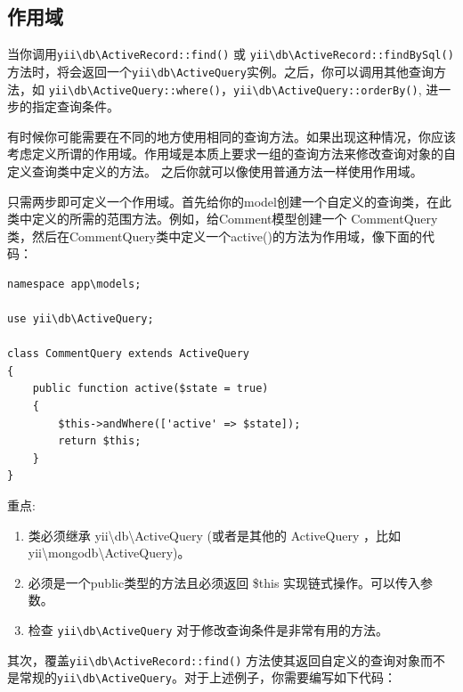 \subsection{作用域}
当你调用\texttt{yii{\allowbreak{}\textbackslash}db{\allowbreak{}\textbackslash}ActiveRecord\allowbreak{}::\allowbreak{}find()} 或 \texttt{yii{\allowbreak{}\textbackslash}db{\allowbreak{}\textbackslash}ActiveRecord\allowbreak{}::\allowbreak{}findBySql()}方法时，将会返回一个\texttt{yii{\allowbreak{}\textbackslash}db{\allowbreak{}\textbackslash}ActiveQuery}实例。之后，你可以调用其他查询方法，如 \texttt{yii{\allowbreak{}\textbackslash}db{\allowbreak{}\textbackslash}ActiveQuery\allowbreak{}::\allowbreak{}where()}，\texttt{yii{\allowbreak{}\textbackslash}db{\allowbreak{}\textbackslash}ActiveQuery\allowbreak{}::\allowbreak{}orderBy()}, 进一步的指定查询条件。

有时候你可能需要在不同的地方使用相同的查询方法。如果出现这种情况，你应该考虑定义所谓的作用域。作用域是本质上要求一组的查询方法来修改查询对象的自定义查询类中定义的方法。 之后你就可以像使用普通方法一样使用作用域。

只需两步即可定义一个作用域。首先给你的model创建一个自定义的查询类，在此类中定义的所需的范围方法。例如，给Comment模型创建一个 CommentQuery类，然后在CommentQuery类中定义一个active()的方法为作用域，像下面的代码：

\lstset{language=php}\begin{lstlisting}
namespace app\models;

use yii\db\ActiveQuery;

class CommentQuery extends ActiveQuery
{
    public function active($state = true)
    {
        $this->andWhere(['active' => $state]);
        return $this;
    }
}
\end{lstlisting}
重点:

\begin{enumerate}
\item 类必须继承 yii{\textbackslash}db{\textbackslash}ActiveQuery (或者是其他的 ActiveQuery ，比如 yii{\textbackslash}mongodb{\textbackslash}ActiveQuery)。
\item 必须是一个public类型的方法且必须返回 \$this 实现链式操作。可以传入参数。
\item 检查 \texttt{yii{\allowbreak{}\textbackslash}db{\allowbreak{}\textbackslash}ActiveQuery} 对于修改查询条件是非常有用的方法。
\end{enumerate}
其次，覆盖\texttt{yii{\allowbreak{}\textbackslash}db{\allowbreak{}\textbackslash}ActiveRecord\allowbreak{}::\allowbreak{}find()} 方法使其返回自定义的查询对象而不是常规的\texttt{yii{\allowbreak{}\textbackslash}db{\allowbreak{}\textbackslash}ActiveQuery}。对于上述例子，你需要编写如下代码：


